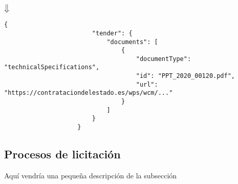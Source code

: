 \begin{itemize}
                \begin{center}
                    $\big\Downarrow$
                \end{center}
                
                \begin{lstlisting}[language=lJSON]
                    {
                        "tender": {
                            "documents": [
                                {
                                    "documentType": "technicalSpecifications",
                                    "id": "PPT_2020_00120.pdf",
                                    "url": "https://contrataciondelestado.es/wps/wcm/..."
                                }
                            ]
                        }
                    }
                \end{lstlisting}
        \end{itemize}

    \vspace{0.3cm}

    \subsection{Procesos de licitación}
    
        Aquí vendría una pequeña descripción de la subsección
    
